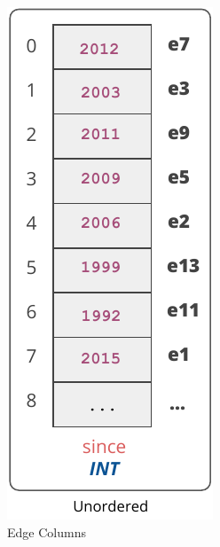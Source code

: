 \begin{figure}
	\vspace{-20pt}
	\hspace*{-20pt}
	\begin{subfigure}{0.45\textwidth}
		\vspace{14pt}
		\centering
		\includegraphics[scale=0.69]{img/sol1}
		\captionsetup{justification=centering}
		\vspace{12pt}
		\caption{Edge Columns}
		\label{fig:sol1}
	\end{subfigure}
	\begin{subfigure}{0.55\textwidth}
		\centering

\end{subfigure}
\end{figure}
